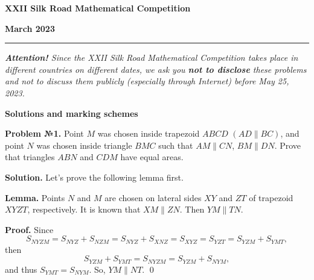 \documentclass[12pt]{article}
\newcounter{problem}
\def\avtor#1{\linebreak[2] \hspace*{\fill}{\small (\mbox{\textit{#1})}}}
\def \Problem#1{\par \bigskip \textbf{Problem №{#1}. }}
\def \solution{\par \bigskip \textbf{Solution. }}
\def \Lemma{\par \bigskip \textbf{Lemma. }}
\def \proof{\par \bigskip \textbf{Proof. }}
\begin{document}
\centerline{\sc \textbf{XXII Silk Road Mathematical Competition }}

\centerline{\sc \textbf{March 2023}}

\bigskip
\hrule
\bigskip

\textsl{\textbf{Attention!} 
Since the XXII Silk Road Mathematical Competition takes place in different countries on different dates, we ask you \textbf{not to disclose} these problems and not to discuss them publicly (especially through Internet) before May 25, 2023.}

\bigskip

\centerline{\sc \textbf{Solutions and marking schemes}}

\bigskip
\Problem{1} Point $M$ was chosen inside trapezoid $ABCD$ $(AD \parallel BC)$, and point $N$ was chosen inside triangle $BMC$ such that $AM \parallel CN$, $BM \parallel DN$. Prove that triangles $ABN$ and $CDM$ have equal areas. \avtor{Sedrakyan~N.}

\solution Let's prove the following lemma first.

\Lemma Points $N$ and $M$ are chosen on lateral sides $XY$ and $ZT$ of trapezoid $XYZT$, respectively. It is known that $XM \parallel ZN$. Then $YM \parallel TN$.

\proof Since 
$$
S_{NYZM}= S_{NYZ}+ S_{NZM}= S_{NYZ}+ S_{XNZ}= S_{XYZ} = S_{YZT}= S_{YZM}+ S_{YMT},
$$
then
$$
S_{YZM}+ S_{YMT}= S_{NYZM}= S_{YZM}+ S_{NYM},
$$
and thus $S_{YMT}= S_{NYM}$. So, $YM \parallel NT$. \qed
\end{document}
